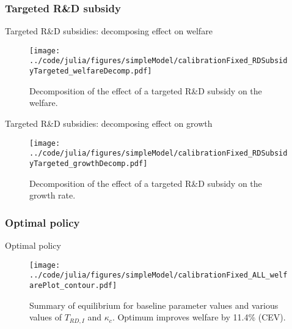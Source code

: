 \documentclass[english,usenames,dvipsnames]{beamer}
\begin{document}
\subsubsection{Targeted R\&D subsidy}



\begin{frame}{Targeted R\&D subsidies: decomposing effect on welfare} \label{plots:oi_rd_subsidies1} 
	\hyperlink{OI_RDsubsidy_table}{}
	\begin{figure}[]
		\texttt{[image: ../code/julia/figures/simpleModel/calibrationFixed\_RDSubsidyTargeted\_welfareDecomp.pdf]}
		\caption{Decomposition of the effect of a targeted R\&D subsidy on the welfare.}
		\label{calibration_OI_RDSubsidy_welfareDecomp}
	\end{figure}
\end{frame}

\begin{frame}{Targeted R\&D subsidies: decomposing effect on growth} \label{plots:oi_rd_subsidies2}
	\hyperlink{OI_RDsubsidy_table}{}
	\begin{figure}[]
		\texttt{[image: ../code/julia/figures/simpleModel/calibrationFixed\_RDSubsidyTargeted\_growthDecomp.pdf]}
		\caption{Decomposition of the effect of a targeted R\&D subsidy on the growth rate.}
		\label{calibration_OI_RDSubsidy_growthDecomp}
	\end{figure}
\end{frame}



\subsubsection{Optimal policy}

\begin{frame}{Optimal policy} \label{plots:all_policies} 
	\hyperlink{all_policies_overview}{}
	\begin{figure}[]
		\texttt{[image: ../code/julia/figures/simpleModel/calibrationFixed\_ALL\_welfarePlot\_contour.pdf]}
		\caption{Summary of equilibrium for baseline parameter values and various values of $T_{RD,I}$ and $\kappa_c$. Optimum improves welfare by 11.4\% (CEV).}
		\label{calibration_ALL_summaryPlot}
	\end{figure}
\end{frame}
\end{document}
